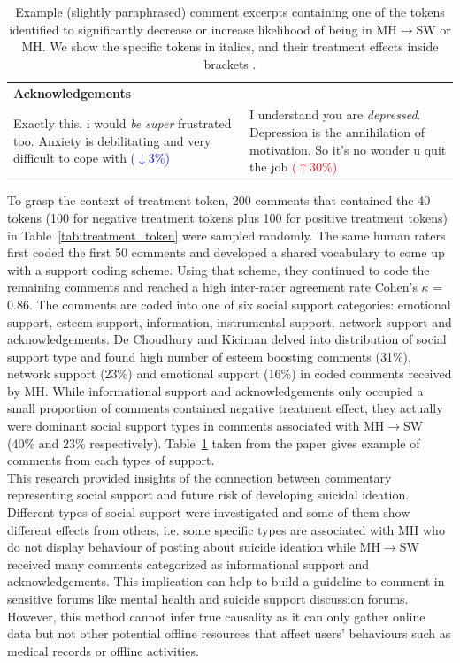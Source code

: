 \begin{table}
\begin{tabularx}{\textwidth}{XX}
\rowcolor{gray}
\textbf{Acknowledgements}&\\
Exactly this. i would \textit{be super} frustrated too. Anxiety is debilitating and very difficult to cope with \textcolor{blue}{($\downarrow$3\%)} & I understand you are \textit{depressed}. Depression is the annihilation of motivation. So it's no wonder u quit the job \textcolor{red}{($\uparrow$30\%)} \\
\bottomrule
\end{tabularx}
\caption{Example (slightly paraphrased) comment excerpts containing one of the tokens identified to significantly decrease or increase likelihood of being in MH$\rightarrow$SW or MH. We show the specific tokens in italics, and their treatment effects inside brackets \cite{DeChoudhury2017}.}
\label{tab:treatment_context}
\end{table}
To grasp the context of treatment token, 200 comments that contained the 40 tokens (100 for negative treatment tokens plus 100 for positive treatment tokens) in Table~\ref{tab:treatment_token} were sampled randomly. The same human raters first coded the first 50 comments and developed a shared vocabulary to come up with a support coding scheme. Using that scheme, they continued to code the remaining comments and reached a high inter-rater agreement rate Cohen’s $\kappa$ = 0.86. The comments are coded into one of six social support categories: emotional support, esteem support, information, instrumental support, network support and acknowledgements. De Choudhury and Kiciman delved into distribution of social support type and found high number of esteem boosting comments (31\%), network support (23\%) and emotional support (16\%) in coded comments received by MH. While informational support and acknowledgements only occupied a small proportion of comments contained negative treatment effect, they actually were dominant social support types in comments associated with MH$\rightarrow$SW (40\% and 23\% respectively). Table~\ref{tab:treatment_context} taken from the paper \cite{DeChoudhury2017} gives example of comments from each types of support.\\
This research provided insights of the connection between commentary representing social support and future risk of developing suicidal ideation. Different types of social support were investigated and some of them show different effects from others, i.e. some specific types are associated with MH who do not display behaviour of posting about suicide ideation while MH$\rightarrow$SW received many comments categorized as informational support and acknowledgements. This implication can help to build a guideline to comment in sensitive forums like mental health and suicide support discussion forums. However, this method cannot infer true causality as it can only gather online data but not other potential offline resources that affect users' behaviours such as medical records or offline activities.\\

